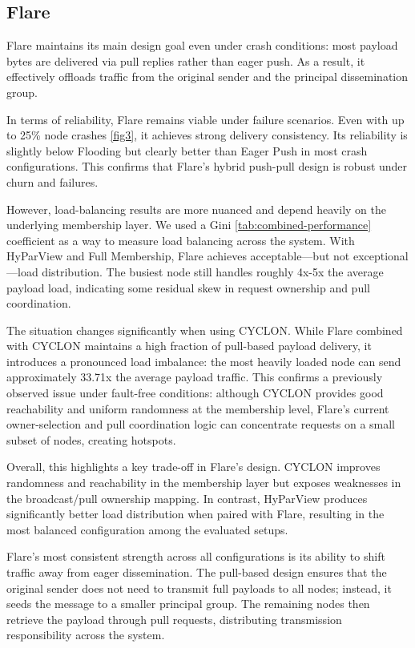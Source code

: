 \documentclass[sigconf,a4paper]{acmart}
\begin{document}
\subsection{Flare}

Flare maintains its main design goal even under crash conditions: most payload bytes are delivered via pull replies rather 
than eager push. As a result, it effectively offloads traffic from the original sender and 
the principal dissemination group.

In terms of reliability, Flare remains viable under failure scenarios. Even with up to 25\% 
node crashes \ref{fig3}, it achieves strong delivery consistency. Its reliability is slightly below 
Flooding but clearly better than Eager Push in most crash configurations. This confirms 
that Flare's hybrid push-pull design is robust under churn and failures.

However, load-balancing results are more nuanced and depend heavily on the underlying 
membership layer. We used a Gini \ref{tab:combined-performance} coefficient as a way to measure load balancing
across the system. With HyParView and Full Membership, Flare achieves acceptable—but not 
exceptional—load distribution. The busiest node still handles roughly 4x-5x the average payload 
load, indicating some residual skew in request ownership and pull coordination.

The situation changes significantly when using CYCLON. While Flare combined with CYCLON maintains 
a high fraction of pull-based payload delivery, it introduces a pronounced load imbalance: the 
most heavily loaded node can send approximately 33.71x the average payload traffic. This 
confirms a previously observed issue under fault-free conditions: although CYCLON provides 
good reachability and uniform randomness at the membership level, Flare's current owner-selection 
and pull coordination logic can concentrate requests on a small subset of nodes, creating hotspots.

Overall, this highlights a key trade-off in Flare's design. CYCLON improves randomness and 
reachability in the membership layer but exposes weaknesses in the broadcast/pull ownership 
mapping. In contrast, HyParView produces significantly better load distribution when paired 
with Flare, resulting in the most balanced configuration among the evaluated setups.

Flare's most consistent strength across all configurations is its ability to shift traffic away 
from eager dissemination. The pull-based design ensures that the original sender does not need 
to transmit full payloads to all nodes; instead, it seeds the message to a smaller principal 
group. The remaining nodes then retrieve the payload through pull requests, distributing 
transmission responsibility across the system.
\end{document}
